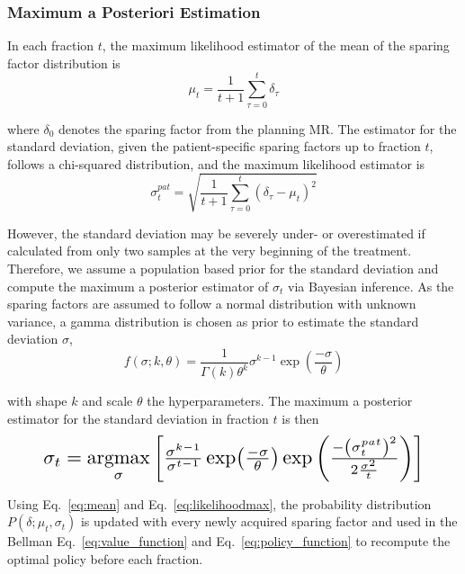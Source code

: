 \documentclass[\relativeRoot/ada.tex]{subfiles}
\begin{document}
\subsubsection{Maximum a Posteriori Estimation}
In each fraction $t$, the maximum likelihood estimator of the mean of the sparing factor distribution is
\begin{equation}\label{eq:mean}
\mu_t = \frac{1}{t+1}\sum_{\tau=0}^t \delta_\tau
\end{equation}

where $\delta_0$ denotes the sparing factor from the planning MR. The estimator for the standard deviation, given the patient-specific sparing factors up to fraction $t$, follows a chi-squared distribution, and the maximum likelihood estimator is
\begin{equation}
\sigma_t^{pat} = \sqrt{ \frac{1}{t+1}\sum_{\tau=0}^t \left( \delta_\tau - \mu_t \right)^2 }
\end{equation}

However, the standard deviation may be severely under- or overestimated if calculated from only two samples at the very beginning of the treatment. Therefore, we assume a population based prior for the standard deviation and compute the maximum a posterior estimator of $\sigma_t$ via Bayesian inference. As the sparing factors are assumed to follow a normal distribution with unknown variance, a gamma distribution is chosen as prior to estimate the standard deviation $\sigma$,
\begin{equation}
    f(\sigma;k,\theta) = \frac{1}{\Gamma(k)\theta^k}\sigma^{k-1}\exp\left(\frac{-\sigma}{\theta}\right)
\end{equation}

with shape $k$ and scale $\theta$ the hyperparameters. The maximum a posterior estimator for the standard deviation in fraction $t$ is then
\begin{equation}\label{eq:likelihoodmax}
\resizebox{0.88\hsize}{!}{$
    \sigma_{t}=\underset{\sigma}{\operatorname{argmax}}\left[\frac{\sigma^{k-1}}{\sigma^{t-1}} \exp (\frac{-\sigma}{\theta}) \exp \left(\frac{-\left(\sigma_{t}^{p a t}\right)^{2}}{2 \frac{\sigma^{2}}{t}}\right)\right]
$}
\end{equation}

Using Eq.~\eqref{eq:mean} and Eq.~\eqref{eq:likelihoodmax}, the probability distribution $P(\delta ; \mu_t, \sigma_t)$ is updated with every newly acquired sparing factor and used in the Bellman Eq.~\eqref{eq:value_function} and Eq.~\eqref{eq:policy_function} to recompute the optimal policy before each fraction.
\end{document}
